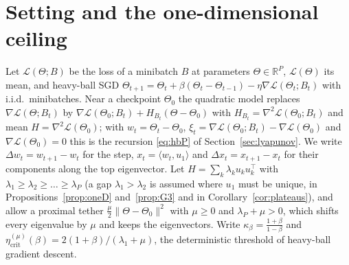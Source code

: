 \documentclass[11pt]{article}
\theoremstyle{remark}
\newcommand{\etacrit}{\eta_{\mathrm{crit}}}
\newcommand{\R}{\mathbb{R}}
\begin{document}
\section{Setting and the one-dimensional ceiling}\label{sec:setting}

Let $\mathcal L(\Theta;B)$ be the loss of a minibatch $B$ at parameters $\Theta\in\R^P$, $\mathcal L(\Theta)$ its mean, and heavy-ball SGD $\Theta_{t+1}=\Theta_t+\beta(\Theta_t-\Theta_{t-1})-\eta\nabla\mathcal L(\Theta_t;B_t)$ with i.i.d.\ minibatches. Near a checkpoint $\Theta_0$ the quadratic model replaces $\nabla\mathcal L(\Theta;B_t)$ by $\nabla\mathcal L(\Theta_0;B_t)+H_{B_t}(\Theta-\Theta_0)$ with $H_{B_t}=\nabla^2\mathcal L(\Theta_0;B_t)$ and mean $H=\nabla^2\mathcal L(\Theta_0)$; with $w_t=\Theta_t-\Theta_0$, $\xi_t=\nabla\mathcal L(\Theta_0;B_t)-\nabla\mathcal L(\Theta_0)$ and $\nabla\mathcal L(\Theta_0)=0$ this is the recursion \eqref{eq:hbP} of Section~\ref{sec:lyapunov}. We write $\Delta w_t=w_{t+1}-w_t$ for the step, $x_t=\langle w_t,u_1\rangle$ and $\Delta x_t=x_{t+1}-x_t$ for their components along the top eigenvector. Let $H=\sum_k\lambda_ku_ku_k^\top$ with $\lambda_1\ge\lambda_2\ge\dots\ge\lambda_P$ (a gap $\lambda_1>\lambda_2$ is assumed where $u_1$ must be unique, in Propositions~\ref{prop:oneD} and~\ref{prop:G3} and in Corollary~\ref{cor:plateaus}), and allow a proximal tether $\frac\mu2\|\Theta-\Theta_0\|^2$ with $\mu\ge0$ and $\lambda_P+\mu>0$, which shifts every eigenvalue by $\mu$ and keeps the eigenvectors. Write $\kappa_\beta=\frac{1+\beta}{1-\beta}$ and $\etacrit^{(\mu)}(\beta)=2(1+\beta)/(\lambda_1+\mu)$, the deterministic threshold of heavy-ball gradient descent.
\end{document}
